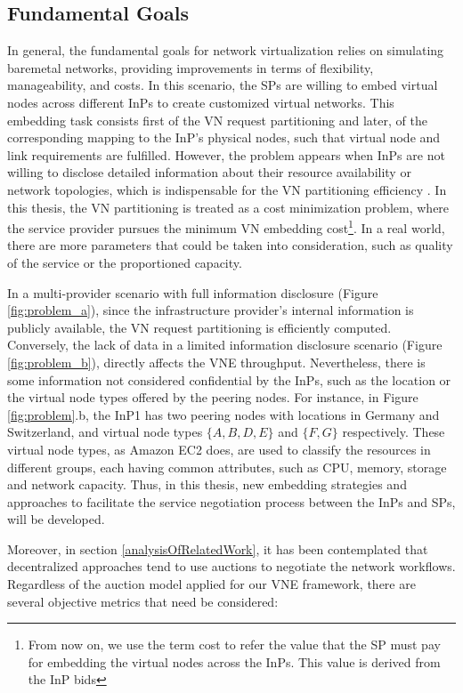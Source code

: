 \subsection{Fundamental Goals}

In general, the fundamental goals for network virtualization relies on simulating baremetal networks, providing improvements in terms of flexibility, manageability, and costs. In this scenario, the SPs are willing to embed virtual nodes across different InPs to create customized virtual networks. This embedding task consists first of the VN request partitioning and later, of the corresponding mapping to the InP's physical nodes, such that virtual node and link requirements are fulfilled. However, the problem appears when InPs are not willing to disclose detailed information about their resource availability or network topologies, which is indispensable for the VN partitioning efficiency \citep{dietrich2015multi}. In this thesis, the VN partitioning is treated as a cost minimization problem, where the service provider pursues the minimum VN embedding cost\footnote{From now on, we use the term cost to refer the value that the SP must pay for embedding the virtual nodes across the InPs. This value is derived from the InP bids}. In a real world, there are more parameters that could be taken into consideration, such as quality of the service or the proportioned capacity.

In a multi-provider scenario with full information disclosure (Figure \ref{fig:problem_a}), since the infrastructure provider's internal information is publicly available, the VN request partitioning is efficiently computed. Conversely, the lack of data in a limited information disclosure scenario (Figure \ref{fig:problem_b}), directly affects the VNE throughput. Nevertheless, there is some information not considered confidential by the InPs, such as the location or the virtual node types offered by the peering nodes. For instance, in Figure \ref{fig:problem}.b, the InP1 has two peering nodes with locations in Germany and Switzerland, and virtual node types $\{A,B,D,E\}$ and $\{F,G\}$ respectively. These virtual node types, as Amazon EC2 \citep{amazonEC2} does, are used to classify the resources in different groups, each having common attributes, such as CPU, memory, storage and network capacity. Thus, in this thesis, new embedding strategies and approaches to facilitate the service negotiation process between the InPs and SPs, will be developed. 

Moreover, in section \ref{analysisOfRelatedWork}, it has been contemplated that decentralized approaches tend to use auctions to negotiate the network workflows. Regardless of the auction model applied for our VNE framework, there are several objective metrics that need be considered: 

